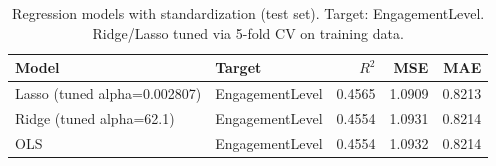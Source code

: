 \begin{table}[t]
\centering
\begin{tabular}{llrrr}
\toprule
Model & Target & $R^2$ & MSE & MAE \\
\midrule
Lasso (tuned alpha=0.002807) & EngagementLevel & 0.4565 & 1.0909 & 0.8213 \\
Ridge (tuned alpha=62.1) & EngagementLevel & 0.4554 & 1.0931 & 0.8214 \\
OLS & EngagementLevel & 0.4554 & 1.0932 & 0.8214 \\
\bottomrule
\end{tabular}
\caption{Regression models with standardization (test set). Target: EngagementLevel. Ridge/Lasso tuned via 5-fold CV on training data.}
\label{tab:auto_regression_results}
\end{table}